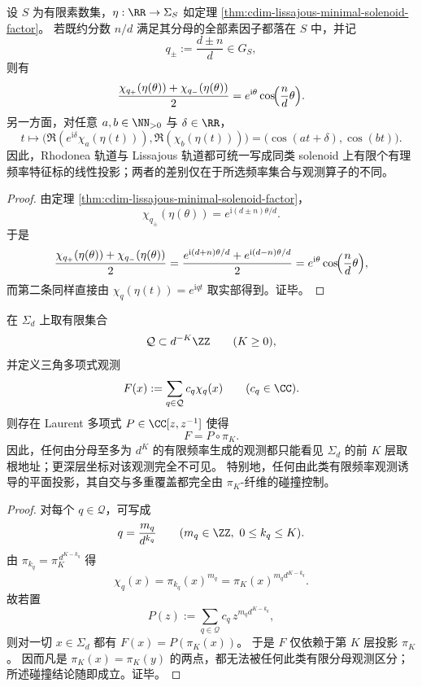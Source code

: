 \begin{corollary}\label{cor:cdim-rational-character-projection-unifies-rose-lissajous}
设 \(S\) 为有限素数集，\(\eta:\RR\to\Sigma_S\) 如定理 \ref{thm:cdim-lissajous-minimal-solenoid-factor}。
若既约分数 \(n/d\) 满足其分母的全部素因子都落在 \(S\) 中，并记
\[
q_{\pm}:=\frac{d\pm n}{d}\in G_S,
\]
则有
\[
\frac{\chi_{q_+}(\eta(\theta))+\chi_{q_-}(\eta(\theta))}{2}
=
e^{\mathrm{i}\theta}\cos\!\Bigl(\frac{n}{d}\theta\Bigr).
\]
另一方面，对任意 \(a,b\in\NN_{>0}\) 与 \(\delta\in\RR\)，
\[
t\longmapsto
\bigl(\Re(e^{\mathrm{i}\delta}\chi_a(\eta(t))),\Re(\chi_b(\eta(t)))\bigr)
=
\bigl(\cos(at+\delta),\cos(bt)\bigr).
\]
因此，Rhodonea 轨道与 Lissajous 轨道都可统一写成同类 solenoid 上有限个有理频率特征标的线性投影；两者的差别仅在于所选频率集合与观测算子的不同。
\end{corollary}
\begin{proof}
由定理 \ref{thm:cdim-lissajous-minimal-solenoid-factor}，
\[
\chi_{q_\pm}(\eta(\theta))=e^{\mathrm{i}(d\pm n)\theta/d}.
\]
于是
\[
\frac{\chi_{q_+}(\eta(\theta))+\chi_{q_-}(\eta(\theta))}{2}
=
\frac{e^{\mathrm{i}(d+n)\theta/d}+e^{\mathrm{i}(d-n)\theta/d}}{2}
=
e^{\mathrm{i}\theta}\cos\!\Bigl(\frac{n}{d}\theta\Bigr),
\]
而第二条同样直接由 \(\chi_q(\eta(t))=e^{\mathrm{i}qt}\) 取实部得到。证毕。
\end{proof}

\begin{theorem}[有限分母观测的有限层可见性与地址碰撞屏障]\label{thm:cdim-solenoid-finite-denominator-visibility-barrier}
在 \(\Sigma_d\) 上取有限集合
\[
\mathcal Q\subset d^{-K}\ZZ
\qquad (K\ge 0),
\]
并定义三角多项式观测
\[
F(x):=\sum_{q\in\mathcal Q}c_q\chi_q(x)
\qquad (c_q\in\CC).
\]
则存在 Laurent 多项式 \(P\in\CC[z,z^{-1}]\) 使得
\[
\boxed{\;
F=P\circ\pi_K.\;}
\]
因此，任何由分母至多为 \(d^K\) 的有限频率生成的观测都只能看见 \(\Sigma_d\) 的前 \(K\) 层取根地址；更深层坐标对该观测完全不可见。
特别地，任何由此类有限频率观测诱导的平面投影，其自交与多重覆盖都完全由 \(\pi_K\)-纤维的碰撞控制。
\end{theorem}
\begin{proof}
对每个 \(q\in\mathcal Q\)，可写成
\[
q=\frac{m_q}{d^{k_q}}
\qquad (m_q\in\ZZ,\ 0\le k_q\le K).
\]
由 \(\pi_{k_q}=\pi_K^{\,d^{K-k_q}}\) 得
\[
\chi_q(x)=\pi_{k_q}(x)^{m_q}
=
\pi_K(x)^{m_qd^{K-k_q}}.
\]
故若置
\[
P(z):=\sum_{q\in\mathcal Q}c_q\,z^{m_qd^{K-k_q}},
\]
则对一切 \(x\in\Sigma_d\) 都有 \(F(x)=P(\pi_K(x))\)。
于是 \(F\) 仅依赖于第 \(K\) 层投影 \(\pi_K\)。
因而凡是 \(\pi_K(x)=\pi_K(y)\) 的两点，都无法被任何此类有限分母观测区分；所述碰撞结论随即成立。证毕。
\end{proof}


